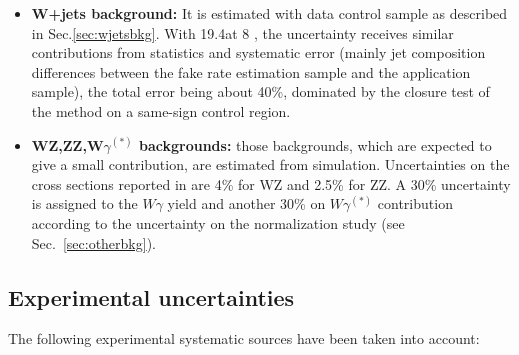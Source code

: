\begin{itemize}
    \item {\bf\boldmath W+jets background:} It is estimated with data control
      sample as described in Sec.\ref{sec:wjetsbkg}. With 19.4\ifb at 8 \TeV,
      the uncertainty receives similar contributions from statistics
      and systematic error (mainly jet composition differences
      between the fake rate estimation sample and the application
      sample), the total error being about 40\%, dominated by the closure
      test of the method on a same-sign control region.
 
    \item {\bf\boldmath WZ,ZZ,W$\gamma^{(*)}$ backgrounds:} those backgrounds, which are
      expected to give a small contribution, are estimated from
      simulation. Uncertainties on the cross sections
      reported in \cite{xsecSM,bib:ellis} are 4\% for WZ and 2.5\% for ZZ.
      A 30\% uncertainty is assigned to the $W\gamma$ \cite{WgammaXsec} yield and another 30\% on $W\gamma^{(*)}$ contribution according 
      to the uncertainty on the normalization study (see Sec.~\ref{sec:otherbkg}).
      
  \end{itemize}

\subsection{Experimental uncertainties \label{subsec:expsyst}}

The following experimental systematic sources have been taken into account:

